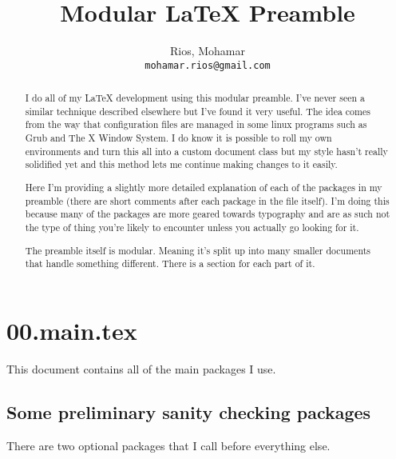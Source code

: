 \newcommand{\preamblefolder}{./include}       %

\usepackage[enable]{easy-todo}                %

\title{Modular \LaTeX{} Preamble}
\author{
  Rios, Mohamar\\
  \texttt{mohamar.rios@gmail.com}
}


  \maketitle
  \tableofcontents
 
  \begin{abstract}
    I do all of my \LaTeX{} development using this modular preamble. I've never seen a similar technique described elsewhere but I've found it very useful. The idea comes from the way that configuration files are managed in some linux programs such as Grub and The X Window System. I do know it is possible to roll my own environments and turn this all into a custom document class but my style hasn't really solidified yet and this method lets me continue making changes to it easily.

    Here I'm providing a slightly more detailed explanation of each of the packages in my preamble (there are short comments after each package in the file itself). I'm doing this because many of the packages are more geared towards typography and are as such not the type of thing you're likely to encounter unless you actually go looking for it.

    The preamble itself is modular. Meaning it's split up into many smaller documents that handle something different. There is a section for each part of it.
  \end{abstract}
  
  \section{00.main.tex}\label{main}
    
    This document contains all of the main packages I use.

    \subsection{Some preliminary sanity checking packages}
      There are two optional packages that I call before everything else.

